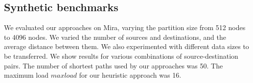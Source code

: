 \subsection{Synthetic benchmarks}

We evaluated our approaches on Mira, varying the partition size from 512 nodes to 4096 nodes. %
We varied the number of sources and destinations, and the average distance between them. 
We also experimented with different data sizes to be transferred. 
We show results for various combinations of source-destination pairs. 
The number of shortest paths used by our approaches was 50. %
The maximum load $maxload$ for our heuristic approach was 16. 
